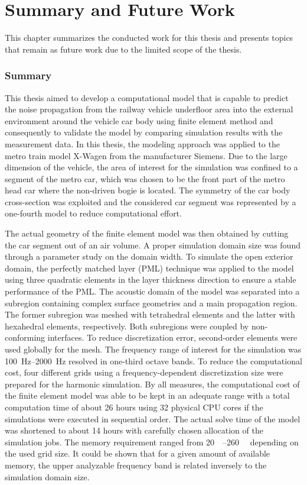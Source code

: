 \chapter{Summary and Future Work}
This chapter summarizes the conducted work for this thesis and presents topics that
remain as future work due to the limited scope of the thesis.
\label{chap:summary}
\subsection*{Summary}
This thesis aimed to develop a computational model that is capable to predict the noise propagation from the railway vehicle underfloor area into the external environment around the vehicle car body using finite element method and consequently to validate the model by comparing simulation results with the measurement data.
In this thesis, the modeling approach was applied to the metro train model X-Wagen from the manufacturer Siemens. Due to the large dimension of the vehicle, the area of interest for the simulation was confined to a segment of the metro car, which was chosen to be the front part of the metro head car where the non-driven bogie is located. The symmetry of the car body cross-section was exploited and the considered car segment was represented by a one-fourth model to reduce computational effort.

The actual geometry of the finite element model was then obtained by cutting the car segment out of an air volume. A proper simulation domain size was found through a parameter study on the domain width.
To simulate the open exterior domain, the perfectly matched layer (PML) technique was applied to the model using three quadratic elements in the layer thickness direction to ensure a stable performance of the PML.
The acoustic domain of the model was separated into a subregion containing complex surface geometries and a main propagation region. The former subregion was meshed with tetrahedral elements and the latter with hexahedral elements, respectively. Both subregions were coupled by non-conforming interfaces. To reduce discretization error, second-order elements were used globally for the mesh.
The frequency range of interest for the simulation was \SIrange{100}{2000}{\hertz} resolved in one-third octave bands. To reduce the computational cost, four different grids using a frequency-dependent discretization size were prepared for the harmonic simulation.
By all measures, the computational cost of the finite element model was able to be kept in an adequate range with a total computation time of about 26 hours using 32 physical CPU cores if the simulations were executed in sequential order. The actual solve time of the model was shortened to about 14 hours with carefully chosen allocation of the simulation jobs. The memory requirement ranged from \SIrange{20}{260}{\giga\byte} depending on the used grid size. It could be shown that for a given amount of available memory, the upper analyzable frequency band is related inversely to the simulation domain size.

